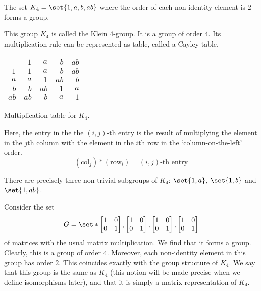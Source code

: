 \documentclass[11pt]{penrose}
\newcommand{\keyword}[1]{\textsf{#1}}
\begin{document}
\begin{nthm}
    The set $K_4 = \set{1, a, b, ab}$ where the order of each non-identity element is $2$ forms a group.
\end{nthm}

This group $K_4$ is called the \keyword{Klein $4$-group}. It is a group of order $4$. Its multiplication rule can be represented as table, called a Cayley table.
\begin{center}
    \begin{tabularx}{0.3\textwidth}{|R||R|R|R|R|}
        \hline
             & $ 1$ & $ a$ & $ b$ & $ab$ \\ \hline\hline
        $ 1$ & $ 1$ & $ a$ & $ b$ & $ab$ \\ \hline
        $ a$ & $ a$ & $ 1$ & $ab$ & $ b$ \\ \hline
        $ b$ & $ b$ & $ab$ & $ 1$ & $ a$ \\ \hline
        $ab$ & $ab$ & $ b$ & $ a$ & $ 1$ \\ \hline
    \end{tabularx}

    {Multiplication table for $K_4$.}
\end{center}

Here, the entry in the the $(i,j)$-th entry is the result of multiplying the element in the $j$th column with the element in the $i$th row in the `column-on-the-left' order.
\begin{equation*}
    (\text{col}_j) * (\text{row}_i) = (i,j)\text{-th entry}
\end{equation*}

There are precisely three non-trivial subgroups of $K_4$: $\set{1, a}$, $\set{1, b}$ and $\set{1, ab}$.

Consider the set
\begin{equation*}
    G = \set*{
    \begin{bmatrix}1 & 0 \\ 0 & 1\end{bmatrix},
    \begin{bmatrix}1 & 0 \\ 0 & 1\end{bmatrix},
    \begin{bmatrix}1 & 0 \\ 0 & 1\end{bmatrix},
    \begin{bmatrix}1 & 0 \\ 0 & 1\end{bmatrix}}
\end{equation*}
of matrices with the usual matrix multiplication. We find that it forms a group. Clearly, this is a group of order $4$. Moreover, each non-identity element in this group has order $2$. This coincides exactly with the group structure of $K_4$. We say that this group is the same as $K_4$ (this notion will be made precise when we define \keyword{isomorphisms} later), and that it is simply a matrix \keyword{representation} of $K_4$.
\end{document}
